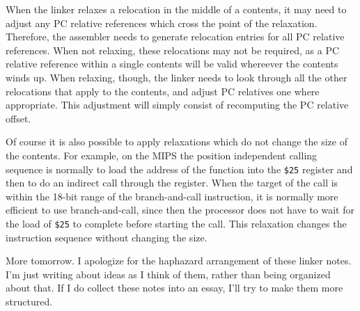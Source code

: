 When the linker relaxes a relocation in the middle of a contents, it may need
to adjust any PC relative references which cross the point of the relaxation.
Therefore, the assembler needs to generate relocation entries for all PC
relative references. When not relaxing, these relocations may not be required,
as a PC relative reference within a single contents will be valid whereever the
contents winds up. When relaxing, though, the linker needs to look through all
the other relocations that apply to the contents, and adjust PC relatives one
where appropriate. This adjustment will simply consist of recomputing the PC
relative offset.

Of course it is also possible to apply relaxations which do not change the size
of the contents. For example, on the MIPS the position independent calling
sequence is normally to load the address of the function into the \texttt{\$25}
register and then to do an indirect call through the register. When the target
of the call is within the 18-bit range of the branch-and-call instruction, it
is normally more efficient to use branch-and-call, since then the processor
does not have to wait for the load of \texttt{\$25} to complete before starting
the call. This relaxation changes the instruction sequence without changing the
size.

More tomorrow. I apologize for the haphazard arrangement of these linker notes.
I'm just writing about ideas as I think of them, rather than being organized
about that. If I do collect these notes into an essay, I'll try to make them
more structured.
